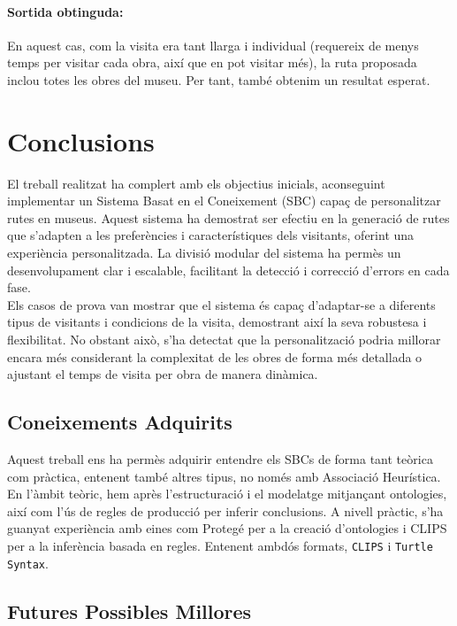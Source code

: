 \documentclass[a4paper]{article}
\begin{document}
	\paragraph{Sortida obtinguda:}
	En aquest cas, com la visita era tant llarga i individual (requereix de menys temps per visitar cada obra, així que en pot visitar més), la ruta proposada inclou totes les obres del museu. Per tant, també obtenim un resultat esperat.
	
	\newpage
	\section{Conclusions}
	
	El treball realitzat ha complert amb els objectius inicials, aconseguint implementar un Sistema Basat en el Coneixement (SBC) capaç de personalitzar rutes en museus. Aquest sistema ha demostrat ser efectiu en la generació de rutes que s'adapten a les preferències i característiques dels visitants, oferint una experiència personalitzada. La divisió modular del sistema ha permès un desenvolupament clar i escalable, facilitant la detecció i correcció d'errors en cada fase. \\ 
	
	Els casos de prova van mostrar que el sistema és capaç d'adaptar-se a diferents tipus de visitants i condicions de la visita, demostrant així la seva robustesa i flexibilitat. No obstant això, s'ha detectat que la personalització podria millorar encara més considerant la complexitat de les obres de forma més detallada o ajustant el temps de visita per obra de manera dinàmica.
	
	\subsection{Coneixements Adquirits}
	
	Aquest treball ens ha permès adquirir entendre els SBCs de forma tant teòrica com pràctica, entenent també altres tipus, no només amb Associació Heurística. En l'àmbit teòric, hem après l'estructuració i el modelatge mitjançant ontologies, així com l'ús de regles de producció per inferir conclusions. A nivell pràctic, s'ha guanyat experiència amb eines com Protegé per a la creació d'ontologies i CLIPS per a la inferència basada en regles. Entenent ambdós formats, \texttt{CLIPS} i \texttt{Turtle Syntax}. \\
	
	\subsection{Futures Possibles Millores}
	
\end{document}
